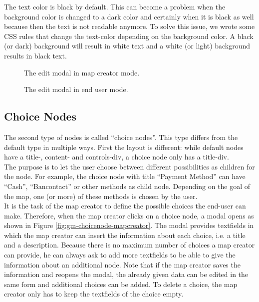The text color is black by default. This can become a problem when the background color is changed to a dark color and certainly when it is black as well because then the text is not readable anymore. To solve this issue, we wrote some CSS rules that change the text-color depending on the background color. A black (or dark) background will result in white text and a white (or light) background results in black text.

\begin{figure}[H]
	\centering
	\caption{The edit modal in map creator mode.}
	\label{fig:gm-editmodal-mapcreator}
\end{figure}

\begin{figure}[H]
	\centering
	\caption{The edit modal in end user mode.}
	\label{fig:gm-editmodal-enduser}
\end{figure}





\subsection{Choice Nodes}
The second type of nodes is called ``choice nodes''. This type differs from the default type in multiple ways. First the layout is different: while default nodes have a title-, content- and controls-div, a choice node only has a title-div.\\

The purpose is to let the user choose between different possibilities as children for the node. For example, the choice node with title ``Payment Method'' can have ``Cash'', ``Bancontact'' or other methods as child node. Depending on the goal of the map, one (or more) of these methods is chosen by the user.\\

It is the task of the map creator to define the possible choices the end-user can make. Therefore, when the map creator clicks on a choice node, a modal opens as shown in Figure \ref{fig:gm-choicenode-mapcreator}. The modal provides textfields in which the map creator can insert the information about each choice, i.e. a title and a description. Because there is no maximum number of choices a map creator can provide, he can always ask to add more textfields to be able to give the information about an additional node. Note that if the map creator saves the information and reopens the modal, the already given data can be edited in the same form and additional choices can be added. To delete a choice, the map creator only has to keep the textfields of the choice empty.\\

